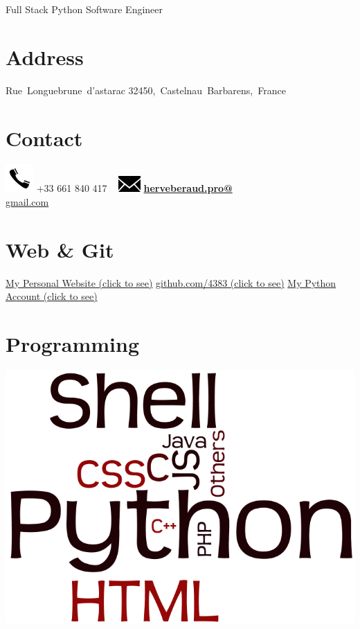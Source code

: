 \documentclass[]{friggeri-cv}
\begin{document}
    {Full Stack Python Software Engineer}
      

\begin{aside}
  \section{Address}
    Rue~Longuebrune~d'astarac
    32450,~Castelnau~Barbarens,~France
    ~
  \section{Contact}
    \includegraphics[scale=0.50]{img/phone.png}
    +33 661 840 417
    ~
    \includegraphics[scale=0.50]{img/mail.png}
    \href{mailto:herveberaud.pro@gmail.com}{\textbf{herveberaud.pro@}\\gmail.com}
    ~
  \section{Web \& Git}
    \href{http://www.herve-beraud.ovh}{My Personal Website (click to see)}
    \href{https://github.com/4383}{github.com/4383 (click to see)}
    \href{https://warehouse.python.org/user/4383/}{My Python Account (click to see)}
    ~
  \section{Programming}
    \includegraphics[scale=0.15]{img/programming.png}
    ~

\end{aside}
\end{document}
